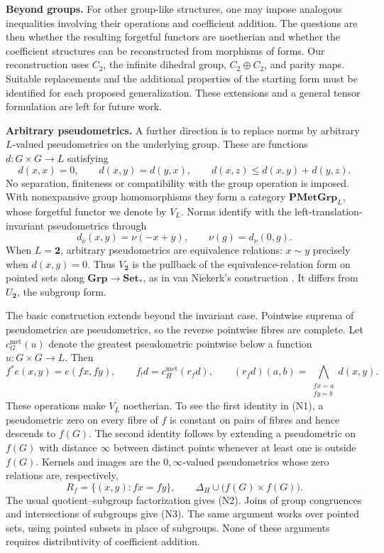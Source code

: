 \documentclass[12pt,a4paper]{amsart}
\theoremstyle{definition}
\newcommand{\Grp}{\mathbf{Grp}}
\newcommand{\two}{\mathbf{2}}
\begin{document}
\medskip
\noindent\textbf{Beyond groups.}
For other group-like structures, one may impose analogous inequalities involving their operations and coefficient addition. The questions are then whether the resulting forgetful functors are noetherian and whether the coefficient structures can be reconstructed from morphisms of forms. Our reconstruction uses $C_2$, the infinite dihedral group, $C_2\oplus C_2$, and parity maps. Suitable replacements and the additional properties of the starting form must be identified for each proposed generalization. These extensions and a general tensor formulation are left for future work.


\medskip
\noindent\textbf{Arbitrary pseudometrics.}
A further direction is to replace norms by arbitrary $L$-valued pseudometrics on the underlying group. These are functions $d:G\times G\to L$ satisfying
\[
 d(x,x)=0,\qquad d(x,y)=d(y,x),\qquad
 d(x,z)\leq d(x,y)+d(y,z).
\]
No separation, finiteness or compatibility with the group operation is imposed. With nonexpansive group homomorphisms they form a category $\mathbf{PMetGrp}_L$, whose forgetful functor we denote by $V_L$. Norms identify with the left-translation-invariant pseudometrics through
\[
 d_\nu(x,y)=\nu(-x+y),\qquad \nu(g)=d_\nu(0,g).
\]
When $L=\two$, arbitrary pseudometrics are equivalence relations: $x\sim y$ precisely when $d(x,y)=0$. Thus $V_{\two}$ is the pullback of the equivalence-relation form on pointed sets along $\Grp\to\mathbf{Set}_*$, as in van Niekerk's construction \cite{vN}. It differs from $U_{\two}$, the subgroup form.

The basic construction extends beyond the invariant case. Pointwise suprema of pseudometrics are pseudometrics, so the reverse pointwise fibres are complete. Let $c_G^{\mathrm{met}}(u)$ denote the greatest pseudometric pointwise below a function $u:G\times G\to L$. Then
\[
 f^*e(x,y)=e(fx,fy),\qquad
 f_!d=c_H^{\mathrm{met}}(r_fd),\qquad
 (r_fd)(a,b)=\bigwedge_{\substack{fx=a\\fy=b}}d(x,y).
\]
These operations make $V_L$ noetherian. To see the first identity in \textup{(N1)}, a pseudometric zero on every fibre of $f$ is constant on pairs of fibres and hence descends to $f(G)$. The second identity follows by extending a pseudometric on $f(G)$ with distance $\infty$ between distinct points whenever at least one is outside $f(G)$. Kernels and images are the $0,\infty$-valued pseudometrics whose zero relations are, respectively,
\[
 R_f=\{(x,y):fx=fy\},\qquad
 \Delta_H\cup\bigl(f(G)\times f(G)\bigr).
\]
The usual quotient--subgroup factorization gives \textup{(N2)}. Joins of group congruences and intersections of subgroups give \textup{(N3)}. The same argument works over pointed sets, using pointed subsets in place of subgroups. None of these arguments requires distributivity of coefficient addition.
\end{document}
